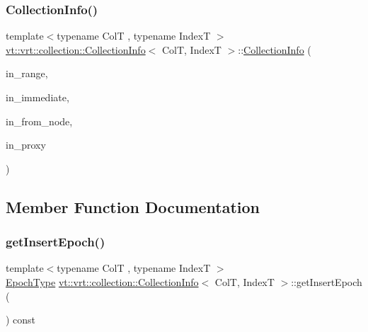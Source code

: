 \subsubsection{\texorpdfstring{Collection\+Info()}{CollectionInfo()}\hspace{0.1cm}{\footnotesize\ttfamily [3/3]}}
{\footnotesize\ttfamily template$<$typename ColT , typename IndexT $>$ \\
\hyperlink{structvt_1_1vrt_1_1collection_1_1_collection_info}{vt\+::vrt\+::collection\+::\+Collection\+Info}$<$ ColT, IndexT $>$\+::\hyperlink{structvt_1_1vrt_1_1collection_1_1_collection_info}{Collection\+Info} (\begin{DoxyParamCaption}\item[{IndexT const \&}]{in\+\_\+range,  }\item[{bool const}]{in\+\_\+immediate,  }\item[{\hyperlink{namespacevt_a866da9d0efc19c0a1ce79e9e492f47e2}{Node\+Type} const \&}]{in\+\_\+from\+\_\+node,  }\item[{\hyperlink{namespacevt_a1b417dd5d684f045bb58a0ede70045ac}{Virtual\+Proxy\+Type}}]{in\+\_\+proxy }\end{DoxyParamCaption})\hspace{0.3cm}{\ttfamily [inline]}}



\subsection{Member Function Documentation}
\mbox{\label{structvt_1_1vrt_1_1collection_1_1_collection_info_a9c81de9eeddd203f92d76d80b2e09e3c}} 
\subsubsection{\texorpdfstring{get\+Insert\+Epoch()}{getInsertEpoch()}}
{\footnotesize\ttfamily template$<$typename ColT , typename IndexT $>$ \\
\hyperlink{namespacevt_a985a5adf291c34a3ca263b3378388236}{Epoch\+Type} \hyperlink{structvt_1_1vrt_1_1collection_1_1_collection_info}{vt\+::vrt\+::collection\+::\+Collection\+Info}$<$ ColT, IndexT $>$\+::get\+Insert\+Epoch (\begin{DoxyParamCaption}{ }\end{DoxyParamCaption}) const\hspace{0.3cm}{\ttfamily [inline]}}

